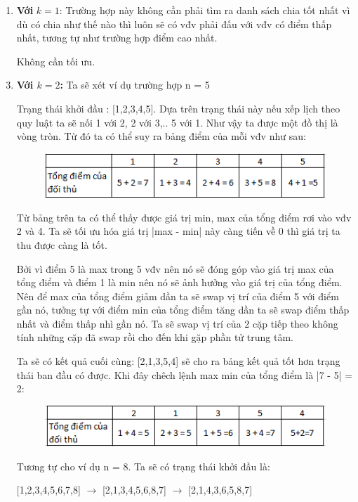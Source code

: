 \documentclass[13pt,a4paper]{article}
\begin{document}
\begin{enumerate}
	\item \textbf{Với} $k = 1$: Trường hợp này không cần phải tìm ra danh sách chia tốt nhất vì dù có chia như thế nào thì luôn sẽ có vđv phải đấu với vđv có điểm thấp nhất, tương tự như trường hợp điểm cao nhất.
	\item[] Không cần tối ưu.
	
	\item \textbf{Với $k = 2$:}  Ta sẽ xét ví dụ trường hợp n = 5
	\item[] Trạng thái khởi đầu : [1,2,3,4,5]. Dựa trên trạng thái này nếu xếp lịch theo quy luật ta sẽ nối 1 với 2, 2 với 3,.. 5 với 1. Như vậy ta được một đồ thị là vòng tròn. Từ đó ta có thể suy ra bảng điểm của mỗi vđv như sau:
	\begin{figure}[H]
		\centering
		\includegraphics[scale=1]{./image/hinh1.png}
	\end{figure}	 
	\item[] Từ bảng trên ta có thể thấy được giá trị min, max của tổng điểm rơi vào vđv 2 và 4. Ta sẽ tối ưu hóa giá trị |max - min| này càng tiến về 0 thì giá trị ta thu được càng là tốt.
	\item[] Bởi vì điểm 5 là max trong 5 vđv nên nó sẽ đóng góp vào giá trị max của tổng điểm và điểm 1 là min nên nó sẽ ảnh hưởng vào giá trị của tổng điểm. Nên để max của tổng điểm giảm dần ta sẽ swap vị trí của điểm 5 với điểm gần nó, tưởng tự với điểm min của tổng điểm tăng dần ta sẽ swap điểm thấp nhất và điểm thấp nhì gần nó. Ta sẽ swap vị trí của 2 cặp  tiếp theo không tính những cặp đã swap rồi cho đến khi gặp phần tử trung tâm.
	\item[] Ta sẽ có kết quả cuối cùng: [2,1,3,5,4] sẽ cho ra bảng kết quả tốt hơn trạng thái ban đầu có được. Khi đây chêch lệnh max min của tổng điểm là |7 - 5| = 2:
	\begin{figure}[H]
		\centering
		\includegraphics[scale=1]{./image/hinh2.png}
	\end{figure}	
	\item[] Tương tự cho ví dụ n = 8. Ta sẽ có trạng thái khởi đầu là:
	\item[][1,2,3,4,5,6,7,8] $\rightarrow$ [2,1,3,4,5,6,8,7] $\rightarrow$ [2,1,4,3,6,5,8,7]
	

\end{enumerate}
\end{document}
